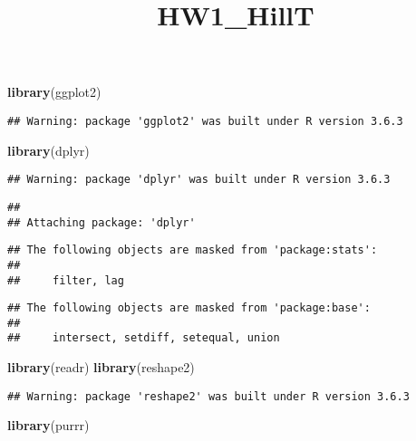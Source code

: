\documentclass[
]{article}
\title{HW1\_HillT}
\author{}
\date{\vspace{-2.5em}}
\newenvironment{Shaded}{\begin{snugshade}}{\end{snugshade}}
\newcommand{\KeywordTok}[1]{\textcolor[rgb]{0.13,0.29,0.53}{\textbf{#1}}}
\newcommand{\NormalTok}[1]{#1}
\begin{document}
\maketitle

\begin{Shaded}
\begin{Highlighting}[]
\KeywordTok{library}\NormalTok{(ggplot2)}
\end{Highlighting}
\end{Shaded}

\begin{verbatim}
## Warning: package 'ggplot2' was built under R version 3.6.3
\end{verbatim}

\begin{Shaded}
\begin{Highlighting}[]
\KeywordTok{library}\NormalTok{(dplyr)}
\end{Highlighting}
\end{Shaded}

\begin{verbatim}
## Warning: package 'dplyr' was built under R version 3.6.3
\end{verbatim}

\begin{verbatim}
## 
## Attaching package: 'dplyr'
\end{verbatim}

\begin{verbatim}
## The following objects are masked from 'package:stats':
## 
##     filter, lag
\end{verbatim}

\begin{verbatim}
## The following objects are masked from 'package:base':
## 
##     intersect, setdiff, setequal, union
\end{verbatim}

\begin{Shaded}
\begin{Highlighting}[]
\KeywordTok{library}\NormalTok{(readr)}
\KeywordTok{library}\NormalTok{(reshape2)}
\end{Highlighting}
\end{Shaded}

\begin{verbatim}
## Warning: package 'reshape2' was built under R version 3.6.3
\end{verbatim}

\begin{Shaded}
\begin{Highlighting}[]
\KeywordTok{library}\NormalTok{(purrr)}
\end{Highlighting}
\end{Shaded}
\end{document}
